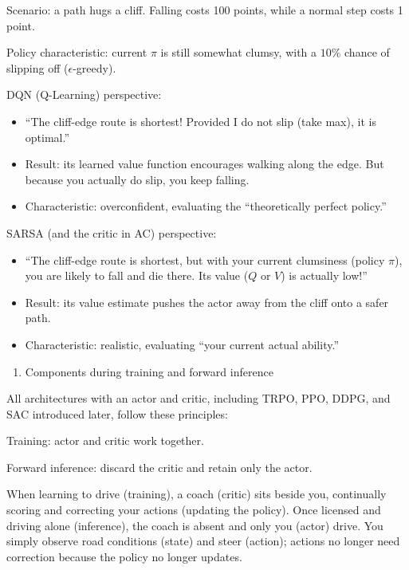 Scenario: a path hugs a cliff. Falling costs 100 points, while a normal step costs 1 point.

Policy characteristic: current \(\pi\) is still somewhat clumsy, with a \(10\%\) chance of slipping off (\(\epsilon\)-greedy).

DQN (Q-Learning) perspective:

\begin{itemize}
\tightlist
\item
  ``The cliff-edge route is shortest! Provided I do not slip (take max), it is optimal.''
\item
  Result: its learned value function encourages walking along the edge. But because you actually do slip, you keep falling.
\item
  Characteristic: overconfident, evaluating the ``theoretically perfect policy.''
\end{itemize}

SARSA (and the critic in AC) perspective:

\begin{itemize}
\tightlist
\item
  ``The cliff-edge route is shortest, but with your current clumsiness (policy \(\pi\)), you are likely to fall and die there. Its value (\(Q\) or \(V\)) is actually low!''
\item
  Result: its value estimate pushes the actor away from the cliff onto a safer path.
\item
  Characteristic: realistic, evaluating ``your current actual ability.''
\end{itemize}

\begin{enumerate}
\def\labelenumi{\arabic{enumi}.}
\setcounter{enumi}{4}
\tightlist
\item
  Components during training and forward inference
\end{enumerate}

All architectures with an actor and critic, including TRPO, PPO, DDPG, and SAC introduced later, follow these principles:

Training: actor and critic work together.

Forward inference: discard the critic and retain only the actor.

When learning to drive (training), a coach (critic) sits beside you, continually scoring and correcting your actions (updating the policy). Once licensed and driving alone (inference), the coach is absent and only you (actor) drive. You simply observe road conditions (state) and steer (action); actions no longer need correction because the policy no longer updates.

